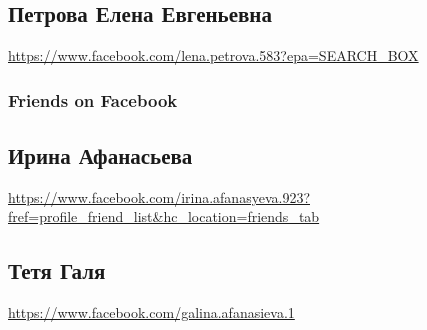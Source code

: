 \subsection{Петрова Елена Евгеньевна}
\url{https://www.facebook.com/lena.petrova.583?epa=SEARCH_BOX}

\subsubsection{Friends on Facebook}

\subsection{Ирина Афанасьева}
\url{https://www.facebook.com/irina.afanasyeva.923?fref=profile_friend_list&hc_location=friends_tab}

\subsection{Тетя Галя}
\url{https://www.facebook.com/galina.afanasieva.1}
  
